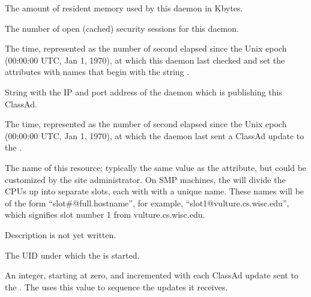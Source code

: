\begin{description}
\item[\AdAttr{MonitorSelfResidentSetSize}:] The amount of resident memory
  used by this daemon in Kbytes.

\item[\AdAttr{MonitorSelfSecuritySessions}:] The number of open (cached)
  security sessions for this daemon.

\item[\AdAttr{MonitorSelfTime}:] The  time, represented as the number of
  second elapsed since the Unix epoch (00:00:00 UTC, Jan 1, 1970),
  at which this daemon last checked and set the attributes with names that
  begin with the string .
  

\item[\AdAttr{MyAddress}:] String with the IP and port address of the
 daemon which is publishing this ClassAd.

\item[\AdAttr{MyCurrentTime}:] The time, represented as the number of
  second elapsed since the Unix epoch (00:00:00 UTC, Jan 1, 1970),
  at which the  daemon last sent a ClassAd update to the
  .

\item[\AdAttr{Name}:] The name of this resource; typically the same value as
  the  attribute, but could be customized by the site
  administrator.
  On SMP machines, the  will divide the CPUs up into separate
  slots, each with with a unique name.
  These names will be of the form ``slot\#@full.hostname'', for example,
  ``slot1@vulture.cs.wisc.edu'', which signifies slot number 1 from
  vulture.cs.wisc.edu.

\item[\AdAttr{PublicNetworkIpAddr}:] Description is not yet written.

\item[\AdAttr{RealUid}:] The UID under which the  is started.

\item[\AdAttr{UpdateSequenceNumber}:] An integer, starting at zero,
  and incremented with each ClassAd update sent to the .
  The  uses this value to sequence the updates it
  receives.

\end{description}

